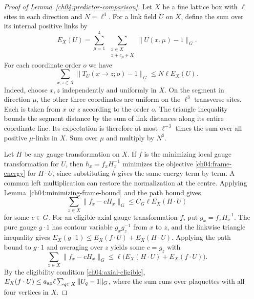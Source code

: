 \begin{proof}[Proof of Lemma~\ref{ch04:predictor-comparison}]
Let $X$ be a fine lattice box with $\ell$ sites in each direction and
$N=\ell^4$. For a link field $U$ on $X$, define the sum over its internal
positive links by
\[
 E_X(U)=\sum_{\mu=1}^4\ \sum_{\substack{x\in X\\x+e_\mu\in X}}
                       \|U(x,\mu)-1\|_G .
\]
For each coordinate order $o$ we have
\[
 \sum_{x,z\in X}\|T_U(x\to z;o)-1\|_G\le N\ell E_X(U).
\]
Indeed, choose $x,z$ independently and uniformly in $X$. On the
segment in direction $\mu$, the other three coordinates are uniform on
the $\ell^3$ transverse sites. Each is taken from $x$ or $z$ according
to the order $o$. The triangle inequality bounds the segment distance by
the sum of link distances along its entire coordinate line. Its expectation
is therefore at most $\ell^{-3}$ times the sum over all positive
$\mu$-links in $X$. Sum over $\mu$ and multiply by $N^2$.

Let $H$ be any gauge transformation on $X$. If $f$ is the minimizing local gauge transformation for $U$,
then $h_x=f_xH_x^{-1}$ minimizes the objective \eqref{ch04:frame-energy} for $H\cdot U$,
since substituting $h$ gives the same energy term by term. A common
left multiplication can restore the normalization at the centre.
Applying Lemma~\ref{ch04:minimizing-frame-bound} and the path bound gives
\[
 \sum_{x\in X}\|f_x-cH_x\|_G\le C_G\ell E_X(H\cdot U)
\]
for some $c\in G$. For an eligible axial gauge transformation $f$, put $g_x=f_xH_x^{-1}$.
The pure gauge $g\cdot1$ has contour variable $g_xg_z^{-1}$ from $x$ to $z$,
and the linkwise triangle inequality gives
$E_X(g\cdot1)\le E_X(f\cdot U)+E_X(H\cdot U)$. Applying the path
bound to $g\cdot1$ and averaging over $z$ yields some $c=g_z$ with
\[
 \sum_{x\in X}\|f_x-cH_x\|_G
 \le \ell\bigl(E_X(H\cdot U)+E_X(f\cdot U)\bigr).
\]
By the eligibility condition \eqref{ch04:axial-eligible},
$E_X(f\cdot U)\le a_{\rm ax}\ell\sum_{q\subset X}\|U_q-1\|_G$,
where the sum runs over plaquettes with all four vertices in $X$.


\end{proof}
